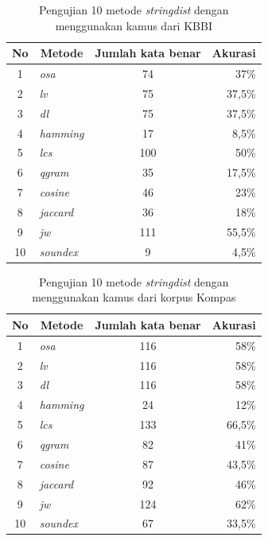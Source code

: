 \begin{table}[H]
	\captionsetup{justification=justified,singlelinecheck=false}
	\caption{Pengujian 10 metode \textit{stringdist} dengan menggunakan kamus dari KBBI}
    \label{tbl:ipb_eval_1}
    \centering
	\begin{tabularx}{\textwidth}{|c X c r|}
		\hline
		No & \multicolumn{1}{c}{Metode} & Jumlah kata benar & \multicolumn{1}{c|}{Akurasi} \\ \hline
		1 & \textit{osa} & 74 & 37\% \\
		2 & \textit{lv} & 75 & 37,5\% \\
		3 & \textit{dl} & 75 & 37,5\% \\
		4 & \textit{hamming} & 17 & 8,5\% \\
		5 & \textit{lcs} & 100 & 50\% \\
		6 & \textit{qgram} & 35 & 17,5\% \\
		7 & \textit{cosine} & 46 & 23\% \\
		8 & \textit{jaccard} & 36 & 18\% \\
		9 & \textit{jw} & 111 & 55,5\% \\
		10 & \textit{soundex} & 9 & 4,5\% \\ \hline
	\end{tabularx}
\end{table}

\begin{table}[H]
	\captionsetup{justification=justified,singlelinecheck=false}
	\caption{Pengujian 10 metode \textit{stringdist} dengan menggunakan kamus dari korpus Kompas}
    \label{tbl:ipb_eval_2}
    \centering
	\begin{tabularx}{\textwidth}{|c X c r|}
		\hline
		No & \multicolumn{1}{c}{Metode} & Jumlah kata benar & \multicolumn{1}{c|}{Akurasi} \\ \hline
		1 & \textit{osa} & 116 & 58\% \\
		2 & \textit{lv} & 116 & 58\% \\
		3 & \textit{dl} & 116 & 58\% \\
		4 & \textit{hamming} & 24 & 12\% \\
		5 & \textit{lcs} & 133 & 66,5\% \\
		6 & \textit{qgram} & 82 & 41\% \\
		7 & \textit{cosine} & 87 & 43,5\% \\
		8 & \textit{jaccard} & 92 & 46\% \\
		9 & \textit{jw} & 124 & 62\% \\
		10 & \textit{soundex} & 67 & 33,5\% \\ \hline
	\end{tabularx}
\end{table}

